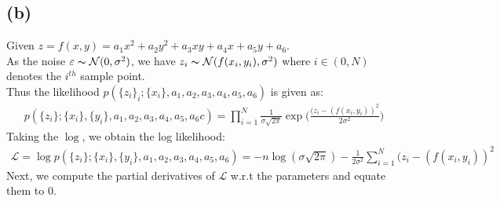 \documentclass[11pt, fleqn]{article}
\begin{document}
\subsection*{(b)}
Given $z = f(x,y) = a_1 x^2 + a_2 y^2 + a_3 xy + a_4 x + a_5 y + a_6$. \\
As the noise $\varepsilon \thicksim \mathcal{N}(0, \sigma^2)$, we have $ z_i \thicksim \mathcal{N}(f(x_i, y_i), \sigma^2) $ where $i \in (0, N)$ denotes the $i^{th}$ sample point. \\
Thus the likelihood $p(\{z_i\}_i; \{x_i\}, a_1, a_2, a_3, a_4, a_5, a_6)$ is given as:
\begin{equation*}
    \begin{split}
        p(\{z_i\}; \{x_i\}, \{y_i\}, a_1, a_2, a_3, a_4, a_5, a_6c) = \prod_{i=1}^{N}\frac{1}{\sigma\sqrt{2\pi}} \exp{\bigg(\frac{(z_i - (f(x_i,y_i))^2}{2\sigma^2}\bigg)}
    \end{split}
\end{equation*}
Taking the $\log$, we obtain the log likelihood:
\begin{equation}
    \label{logl2}
    \begin{split}
        \boxed{\mathcal{L} = \log{p(\{z_i\}; \{x_i\}, \{y_i\}, a_1, a_2, a_3, a_4, a_5, a_6)} = - n\log(\sigma\sqrt{2\pi}) -\frac{1}{{2\sigma^2}}\sum_{i=1}^{N} (z_i - (f(x_i,y_i))^2 }
    \end{split}
\end{equation}
Next, we compute the partial derivatives of $\mathcal{L}$ w.r.t the parameters and equate them to 0.
\end{document}
